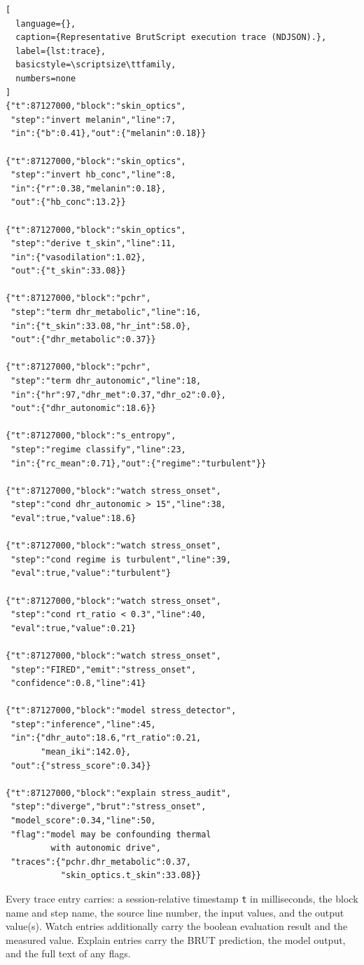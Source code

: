 \documentclass[10pt,twocolumn,a4paper]{article}
\theoremstyle{definition}
\theoremstyle{remark}
\begin{document}
\begin{lstlisting}[
  language={},
  caption={Representative BrutScript execution trace (NDJSON).},
  label={lst:trace},
  basicstyle=\scriptsize\ttfamily,
  numbers=none
]
{"t":87127000,"block":"skin_optics",
 "step":"invert melanin","line":7,
 "in":{"b":0.41},"out":{"melanin":0.18}}

{"t":87127000,"block":"skin_optics",
 "step":"invert hb_conc","line":8,
 "in":{"r":0.38,"melanin":0.18},
 "out":{"hb_conc":13.2}}

{"t":87127000,"block":"skin_optics",
 "step":"derive t_skin","line":11,
 "in":{"vasodilation":1.02},
 "out":{"t_skin":33.08}}

{"t":87127000,"block":"pchr",
 "step":"term dhr_metabolic","line":16,
 "in":{"t_skin":33.08,"hr_int":58.0},
 "out":{"dhr_metabolic":0.37}}

{"t":87127000,"block":"pchr",
 "step":"term dhr_autonomic","line":18,
 "in":{"hr":97,"dhr_met":0.37,"dhr_o2":0.0},
 "out":{"dhr_autonomic":18.6}}

{"t":87127000,"block":"s_entropy",
 "step":"regime classify","line":23,
 "in":{"rc_mean":0.71},"out":{"regime":"turbulent"}}

{"t":87127000,"block":"watch stress_onset",
 "step":"cond dhr_autonomic > 15","line":38,
 "eval":true,"value":18.6}

{"t":87127000,"block":"watch stress_onset",
 "step":"cond regime is turbulent","line":39,
 "eval":true,"value":"turbulent"}

{"t":87127000,"block":"watch stress_onset",
 "step":"cond rt_ratio < 0.3","line":40,
 "eval":true,"value":0.21}

{"t":87127000,"block":"watch stress_onset",
 "step":"FIRED","emit":"stress_onset",
 "confidence":0.8,"line":41}

{"t":87127000,"block":"model stress_detector",
 "step":"inference","line":45,
 "in":{"dhr_auto":18.6,"rt_ratio":0.21,
       "mean_iki":142.0},
 "out":{"stress_score":0.34}}

{"t":87127000,"block":"explain stress_audit",
 "step":"diverge","brut":"stress_onset",
 "model_score":0.34,"line":50,
 "flag":"model may be confounding thermal
         with autonomic drive",
 "traces":{"pchr.dhr_metabolic":0.37,
           "skin_optics.t_skin":33.08}}
\end{lstlisting}

Every trace entry carries: a session-relative timestamp \texttt{t} in
milliseconds, the block name and step name, the source line number,
the input values, and the output value(s).  Watch entries additionally
carry the boolean evaluation result and the measured value.  Explain
entries carry the BRUT prediction, the model output, and the full text
of any flags.
\end{document}
